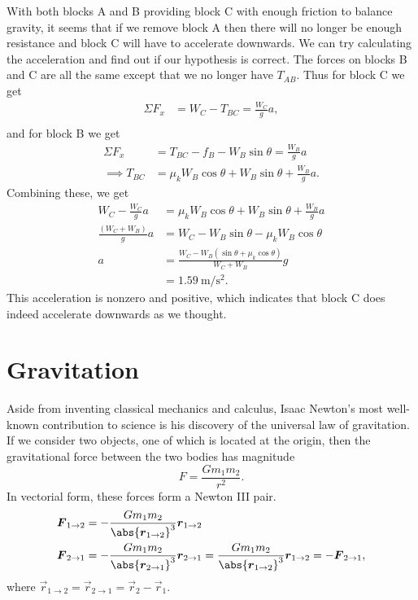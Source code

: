 \documentclass[../classical_mechanics.tex]{subfiles}
\begin{document}
\begin{example}
            With both blocks A and B providing block C with enough friction to balance gravity, it seems that if we remove block A then there will no longer be enough resistance and block C will have to accelerate downwards.
            We can try calculating the acceleration and find out if our hypothesis is correct.
            The forces on blocks B and C are all the same except that we no longer have $T_{AB}$.
            Thus for block C we get
            \begin{align}
                \Sigma F_x&=W_C-T_{BC}=\frac{W_C}{g}a,\\
            \end{align}
            and for block B we get
            \begin{align}
                \Sigma F_x&=T_{BC}-f_B-W_B\sin\theta=\frac{W_B}{g}a\\
                \implies T_{BC}&=\mu_k W_B\cos\theta+W_B\sin\theta+\frac{W_B}{g}a.
            \end{align}
            Combining these, we get
            \begin{align}
                W_C-\frac{W_C}{g}a&=\mu_k W_B\cos\theta+W_B\sin\theta+\frac{W_B}{g}a\\
                \frac{(W_C+W_B)}{g}a&=W_C-W_B\sin\theta-\mu_k W_B\cos\theta\\
                a&=\frac{W_C-W_B(\sin\theta+\mu_k\cos\theta)}{W_C+W_B}g\\
                &=\qty{1.59}{\metre\per\square\second}.
            \end{align}
            This acceleration is nonzero and positive, which indicates that block C does indeed accelerate downwards as we thought.
        \end{example}

    \section{Gravitation}\label{sec:gravitation}
        Aside from inventing classical mechanics and calculus, Isaac Newton's most well-known contribution to science is his discovery of the universal law of gravitation.
        If we consider two objects, one of which is located at the origin, then the gravitational force between the two bodies has magnitude
        \begin{equation}
            F=\frac{Gm_1m_2}{r^2}.
        \end{equation}
        In vectorial form, these forces form a Newton III pair.
        \begin{align}
            \vec{F}_{1\to2}&=-\frac{Gm_1m_2}{\abs{\vec{r}_{1\to2}}^3}\vec{r}_{1\to2}\\
            \vec{F}_{2\to1}&=-\frac{Gm_1m_2}{\abs{\vec{r}_{2\to1}}^3}\vec{r}_{2\to1}=\frac{Gm_1m_2}{\abs{\vec{r}_{1\to2}}^3}\vec{r}_{1\to2}=-\vec{F}_{2\to1},
        \end{align}
        where $\vec{r}_{1\to2}=\vec{r}_{2\to1}=\vec{r}_2-\vec{r}_1$.
        
\end{document}
